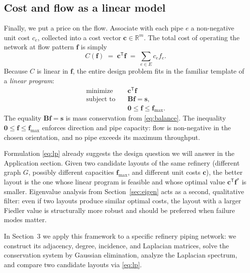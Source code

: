 \documentclass[11pt,a4paper]{article}
\newcommand{\RR}{\mathbb{R}}
\newcommand{\mat}[1]{\mathbf{#1}}
\newcommand{\vect}[1]{\mathbf{#1}}
\newcommand{\transpose}{^{\mathsf{T}}}
\begin{document}
\subsection{Cost and flow as a linear model}
\label{sec:cost}

Finally, we put a price on the flow. Associate with each pipe $e$ a
non-negative unit cost $c_e$, collected into a cost vector
$\vect{c} \in \RR^{m}$. The total cost of operating the network at
flow pattern $\vect{f}$ is simply
\begin{equation}
  C(\vect{f}) \;=\; \vect{c}\transpose \vect{f} \;=\;
  \sum_{e \in E} c_e f_e.
  \label{eq:cost}
\end{equation}
Because $C$ is linear in $\vect{f}$, the entire design problem fits in
the familiar template of a \emph{linear program}:
\begin{equation}
  \begin{aligned}
    \text{minimize} \quad & \vect{c}\transpose \vect{f} \\
    \text{subject to} \quad & \mat{B}\vect{f} = \vect{s}, \\
    & \vect{0} \le \vect{f} \le \vect{f}_{\max}.
  \end{aligned}
  \label{eq:lp}
\end{equation}
The equality $\mat{B}\vect{f} = \vect{s}$ is mass conservation from
\eqref{eq:balance}. The inequality $\vect{0} \le \vect{f} \le
\vect{f}_{\max}$ enforces direction and pipe capacity: flow is
non-negative in the chosen orientation, and no pipe exceeds its maximum
throughput.

Formulation \eqref{eq:lp} already suggests the design question we will
answer in the Application section. Given two candidate layouts of the
same refinery (different graph $G$, possibly different capacities
$\vect{f}_{\max}$, and different unit costs $\vect{c}$), the better
layout is the one whose linear program is feasible and whose optimal
value $\vect{c}\transpose \vect{f}^{*}$ is smaller. Eigenvalue analysis
from Section~\ref{sec:eigen} acts as a second, qualitative filter: even
if two layouts produce similar optimal costs, the layout with a larger
Fiedler value is structurally more robust and should be preferred when
failure modes matter.

In Section~3 we apply this framework to a specific refinery piping
network: we construct its adjacency, degree, incidence, and Laplacian
matrices, solve the conservation system by Gaussian elimination,
analyze the Laplacian spectrum, and compare two candidate layouts via
\eqref{eq:lp}.
\end{document}
